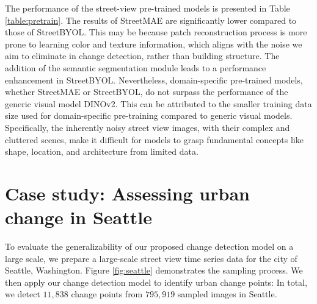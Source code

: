 \documentclass[letterpaper]{article} %
\begin{document}
The performance of the street-view pre-trained models is presented in Table \ref{table:pretrain}. The results of StreetMAE are significantly lower compared to those of StreetBYOL. This may be because patch reconstruction process is more prone to learning color and texture information, which aligns with the noise we aim to eliminate in change detection, rather than building structure. The addition of the semantic segmentation module leads to a performance enhancement in StreetBYOL. Nevertheless, domain-specific pre-trained models, whether StreetMAE or StreetBYOL, do not surpass the performance of the generic visual model DINOv2. This can be attributed to the smaller training data size used for domain-specific pre-training compared to generic visual models. Specifically, the inherently noisy street view images, with their complex and cluttered scenes, make it difficult for models to grasp fundamental concepts like shape, location, and architecture from limited data.

\section{Case study: Assessing urban change in Seattle}
To evaluate the generalizability of our proposed change detection model on a large scale, we prepare a large-scale street view time series data for the city of Seattle, Washington. Figure \ref{fig:seattle} demonstrates the sampling process. We then apply our change detection model to identify urban change points: In total, we detect $11,838$ change points from $795,919$ sampled images in Seattle.
\end{document}
